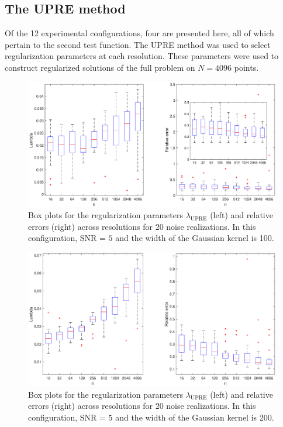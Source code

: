 \documentclass[12pt]{article}
\newcommand{\regparam}{\lambda}
\begin{document}
\subsection{The UPRE method} \label{The UPRE method}
Of the 12 experimental configurations, four are presented here, all of which pertain to the second test function. The UPRE method was used to select regularization parameters at each resolution. These parameters were used to construct regularized solutions of the full problem on $N = 4096$ points.

\begin{figure}
	\centerline{\includegraphics[scale = 0.4]{Figures/BothBoxes1D_F2_S05_W100_R20.eps}}
\caption{Box plots for the regularization parameters $\regparam_{\text{UPRE}}$ (left) and relative errors (right) across resolutions for 20 noise realizations. In this configuration, $\text{SNR = 5}$ and the width of the Gaussian kernel is 100.}
\label{BothBoxes1D_F2_S05_W100_R20}
\end{figure}

\begin{figure}
	\centerline{\includegraphics[scale = 0.4]{Figures/BothBoxes1D_F2_S05_W200_R20.eps}}
\caption{Box plots for the regularization parameters $\regparam_{\text{UPRE}}$  (left) and relative errors (right) across resolutions for 20 noise realizations. In this configuration, $\text{SNR = 5}$ and the width of the Gaussian kernel is 200.}
\end{figure}
\end{document}
